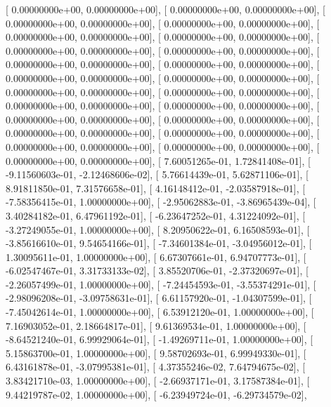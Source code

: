 \documentclass{article}
\begin{document}
       [  0.00000000e+00,   0.00000000e+00],
       [  0.00000000e+00,   0.00000000e+00],
       [  0.00000000e+00,   0.00000000e+00],
       [  0.00000000e+00,   0.00000000e+00],
       [  0.00000000e+00,   0.00000000e+00],
       [  0.00000000e+00,   0.00000000e+00],
       [  0.00000000e+00,   0.00000000e+00],
       [  0.00000000e+00,   0.00000000e+00],
       [  0.00000000e+00,   0.00000000e+00],
       [  0.00000000e+00,   0.00000000e+00],
       [  0.00000000e+00,   0.00000000e+00],
       [  0.00000000e+00,   0.00000000e+00],
       [  0.00000000e+00,   0.00000000e+00],
       [  0.00000000e+00,   0.00000000e+00],
       [  0.00000000e+00,   0.00000000e+00],
       [  0.00000000e+00,   0.00000000e+00],
       [  0.00000000e+00,   0.00000000e+00],
       [  0.00000000e+00,   0.00000000e+00],
       [  0.00000000e+00,   0.00000000e+00],
       [  0.00000000e+00,   0.00000000e+00],
       [  0.00000000e+00,   0.00000000e+00],
       [  0.00000000e+00,   0.00000000e+00],
       [  0.00000000e+00,   0.00000000e+00],
       [  7.60051265e-01,   1.72841408e-01],
       [ -9.11560603e-01,  -2.12468606e-02],
       [  5.76614439e-01,   5.62871106e-01],
       [  8.91811850e-01,   7.31576658e-01],
       [  4.16148412e-01,  -2.03587918e-01],
       [ -7.58356415e-01,   1.00000000e+00],
       [ -2.95062883e-01,  -3.86965439e-04],
       [  3.40284182e-01,   6.47961192e-01],
       [ -6.23647252e-01,   4.31224092e-01],
       [ -3.27249055e-01,   1.00000000e+00],
       [  8.20950622e-01,   6.16508593e-01],
       [ -3.85616610e-01,   9.54654166e-01],
       [ -7.34601384e-01,  -3.04956012e-01],
       [  1.30095611e-01,   1.00000000e+00],
       [  6.67307661e-01,   6.94707773e-01],
       [ -6.02547467e-01,   3.31733133e-02],
       [  3.85520706e-01,  -2.37320697e-01],
       [ -2.26057499e-01,   1.00000000e+00],
       [ -7.24454593e-01,  -3.55374291e-01],
       [ -2.98096208e-01,  -3.09758631e-01],
       [  6.61157920e-01,  -1.04307599e-01],
       [ -7.45042614e-01,   1.00000000e+00],
       [  6.53912120e-01,   1.00000000e+00],
       [  7.16903052e-01,   2.18664817e-01],
       [  9.61369534e-01,   1.00000000e+00],
       [ -8.64521240e-01,   6.99929064e-01],
       [ -1.49269711e-01,   1.00000000e+00],
       [  5.15863700e-01,   1.00000000e+00],
       [  9.58702693e-01,   6.99949330e-01],
       [  6.43161878e-01,  -3.07995381e-01],
       [  4.37355246e-02,   7.64794675e-02],
       [  3.83421710e-03,   1.00000000e+00],
       [ -2.66937171e-01,   3.17587384e-01],
       [  9.44219787e-02,   1.00000000e+00],
       [ -6.23949724e-01,  -6.29734579e-02],
\end{document}
